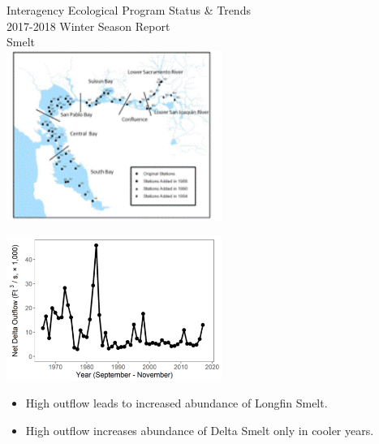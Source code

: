 \documentclass[]{article}\usepackage[]{graphicx}\usepackage[]{color}
\begin{document}
\begin{Row}
  \begin{Cell}{7}
    \vspace{0.2cm}
    \begin{center}
      \doublespacing
      {\Large Interagency Ecological Program Status \& Trends } \\
      \vspace{0.2cm}
      {\Large 2017-2018 Winter Season Report} \\
      \vspace{0.3cm}
      {\Huge Smelt} \\
      \vspace{0.3cm}
      \includegraphics[width=7cm,align=m]{figures/smelt/map.png}
    \end{center}
  \end{Cell}
  \begin{Cell}{6}
    \vspace{0.2cm}
    \begin{center}
      \includegraphics[width=7cm,trim=0 0 0 0,clip,align=m]{figures/smelt/outflow_tmp.png}
      \begin{itemize}[leftmargin=*]
        \item High outflow leads to increased abundance of Longfin Smelt.
        \item High outflow increases abundance of Delta Smelt only in cooler years.
      \end{itemize}
    \end{center}
  \end{Cell}
\end{Row}
\end{document}
